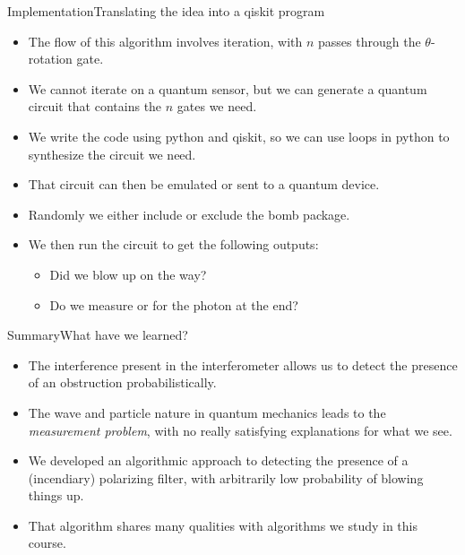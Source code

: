 \begin{frame}{Implementation}{Translating the idea into a qiskit program}
\begin{itemize}
    \item The flow of this algorithm involves iteration, with $n$ passes through the $\theta$-rotation gate.
    \item We cannot iterate on a quantum sensor, but we can generate a quantum circuit that contains the $n$ gates we need.
    \item We write the code using python and qiskit, so we can use loops in python to synthesize the circuit we need.
    \item That circuit can then be emulated or sent to a quantum device.
    \item Randomly we either include or exclude the bomb package.
    \item We then run the circuit to get the following outputs:
    \begin{itemize}
        \item Did we blow up on the way?
        \item Do we measure  or  for the photon at the end?
    \end{itemize}
\end{itemize}



\end{frame}

\begin{frame}{Summary}{What have we learned?}
\begin{itemize}
   \item The interference present in the interferometer allows us to detect the presence of an obstruction probabilistically.
   \item The wave and particle nature in quantum mechanics leads to the \emph{measurement problem}, with no really satisfying explanations for what we see.
   \item We developed an algorithmic approach to detecting the presence of a (incendiary) polarizing filter, with arbitrarily low probability of blowing things up.
   \item That algorithm shares many qualities with algorithms we study in this course.
   \end{itemize}
\end{frame}
